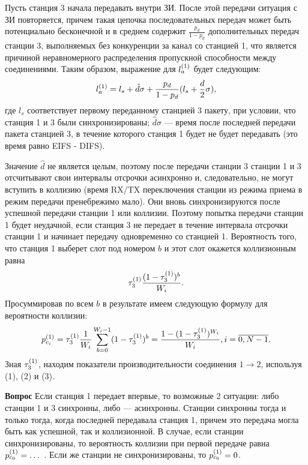 {Пусть станция 3 начала передавать внутри ЗИ. После этой передачи ситуация с ЗИ повторяется, причем такая цепочка последовательных передач может быть потенциально бесконечной и в среднем содержит $\frac{p_d}{1-p_d}$ дополнительных передач станции 3, выполняемых без конкуренции за канал со станцией 1, что является причиной неравномерного распределения пропускной способности между соединениями. Таким образом, выражение для $l_{a}^{(1)}$ будет следующим:
\begin{equation}
l_{a}^{(1)} = l_s + \hat{d}\sigma + \frac{p_d}{1-p_d}(l_s+\frac{d}{2}\sigma),
\end{equation}
где $l_s$ соответствует первому переданному станцией 3 пакету, при условии, что станция 1 и 3 были синхронизированы; $\hat{d}\sigma$ --- время после последней передачи пакета станцией 3, в течение которого станция 1 будет не будет передавать (это время равно EIFS - DIFS).

Значение $\hat{d}$ не является целым, поэтому после передачи станции 3 станции 1 и 3 отсчитывают свои интервалы отсрочки асинхронно и, следовательно, не могут вступить в коллизию (время RX/TX переключения станции из режима приема в режим передачи пренебрежимо мало). Они вновь синхронизируются  после успешной передачи станции 1 или коллизии. Поэтому попытка передачи станции 1 будет неудачной, если станция 3 не передает в течение интервала отсрочки станции 1 и начинает передачу одновременно со станцией 1. Вероятность того, что станция 1 выберет слот под номером $b$ и этот слот окажется коллизионным равна
\begin{equation}
\tau_{3}^{(1)}\frac{(1-\tau_{3}^{(1)})^b}{W_i}.
\end{equation}
Просуммировав по всем $b$ в результате имеем следующую формулу для вероятности коллизии:
\begin{equation}
p_{c_{i}}^{(1)} = \tau_{3}^{(1)} \frac{1}{W_i}\sum\limits_{b = 0}^{W_i-1}(1-\tau_{3}^{(1)})^b = 
\frac{1 - (1-\tau_{3}^{(1)})^{W_i}}{W_i}, i = \overline{0,N-1}.
\end{equation}
Зная $\tau_{3}^{(1)}$, находим показатели производительности соединения $1 \rightarrow 2$, используя (1), (2) и (3).

\textbf{Вопрос} Если станция 1 передает впервые, то возможные 2 ситуации: либо станции 1 и 3 синхронны, либо --- асинхронны. Станции синхронны тогда и только тогда, когда последней передавала станция 1, причем это передача могла быть как успешной, так и коллизионной. В случае, если станции синхронизированы, то вероятность коллизии при первой передаче равна $p_{c_{0}}^{(1)} = \dots$ . Если же станции не синхронизированы, то $p_{c_{0}}^{(1)} = 0$.

}
